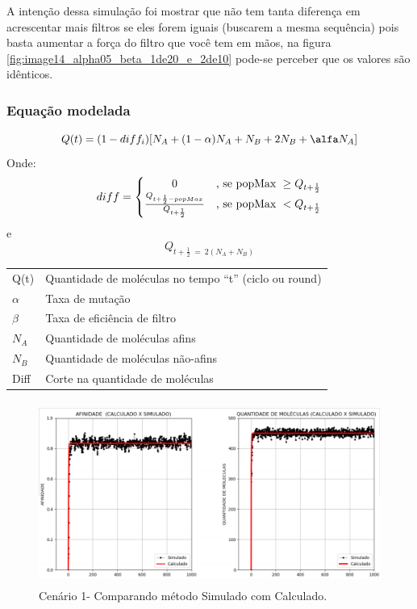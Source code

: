 A intenção dessa simulação foi mostrar que não tem tanta diferença em
acrescentar mais filtros se eles forem iguais (buscarem a mesma sequência) pois basta
aumentar a força do filtro que você tem em mãos, na figura \ref{fig:image14_alpha05_beta_1de20_e_2de10} pode-se perceber que os valores são idênticos. 

\subsubsection{Equação modelada}

\begin{equation}
    Q(t) = ( 1 - diff_i )[N_A + (1 - \alpha )N_A + N_B + 2N_B + \alfa N_A]
\end{equation}
Onde:
\begin{equation}
    diff = \left\{\begin{matrix}
        0
        &\hbox{, se popMax }\geq Q_{t + \frac{1}{2}}\\ 
        \frac{Q_{t + \frac{1}{2} - popMax}}{Q_{t + \frac{1}{2}}}
        &\hbox{, se popMax }< Q_{t + \frac{1}{2}}
    \end{matrix}\right.
\end{equation}
e
\begin{equation}
    Q_{t + \frac{1}{2}\ =\ 2(N_A + N_B)}
\end{equation}

\vspace{1cm}

\begin{flushleft}
\begin{tabular}{l|l}
Q(t)     & Quantidade de moléculas no tempo “t” (ciclo ou round) \\
$\alpha$ & Taxa de mutação\\
$\beta$  &Taxa de eficiência de filtro\\
$N_A$       & Quantidade de moléculas afins\\
$N_B$       & Quantidade de moléculas não-afins\\
Diff        & Corte na quantidade de moléculas\\
\end{tabular}
\end{flushleft}

\begin{figure}[!h]
    \centering
    \includegraphics[width=15cm,height=6cm]{figures/img-calculated-simulated.png}
    \caption{Cenário 1- Comparando método Simulado com Calculado.}
    \label{fig:img-calculated-simulated}
\end{figure}
\newpage

